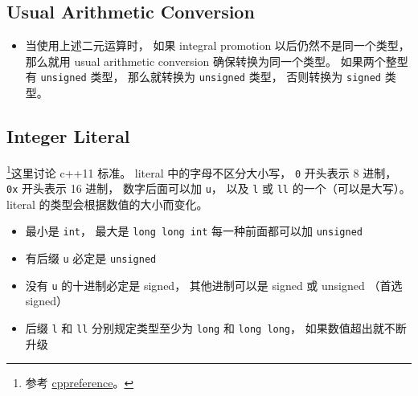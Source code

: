 \subsection{Usual Arithmetic Conversion}
\begin{itemize}
\item 当使用上述二元运算时， 如果 integral promotion 以后仍然不是同一个类型， 那么就用 usual arithmetic conversion 确保转换为同一个类型。 如果两个整型有 \verb`unsigned` 类型， 那么就转换为 \verb`unsigned` 类型， 否则转换为 \verb`signed` 类型。
\end{itemize}

\subsection{Integer Literal}
\footnote{参考 \href{https://en.cppreference.com/w/cpp/language/integer_literal}{cppreference}。}这里讨论 c++11 标准。 literal 中的字母不区分大小写， \verb`0` 开头表示 8 进制，  \verb`0x` 开头表示 16 进制， 数字后面可以加 \verb`u`， 以及 \verb`l` 或 \verb`ll` 的一个（可以是大写）。 literal 的类型会根据数值的大小而变化。

\begin{itemize}
\item 最小是 \verb`int`， 最大是 \verb`long long int` 每一种前面都可以加 \verb`unsigned`
\item 有后缀 \verb`u` 必定是 \verb`unsigned`
\item 没有 \verb`u` 的十进制必定是 signed， 其他进制可以是 signed 或 unsigned （首选 signed）
\item 后缀 \verb`l` 和 \verb`ll` 分别规定类型至少为 \verb`long` 和 \verb`long long`， 如果数值超出就不断升级
\end{itemize}
